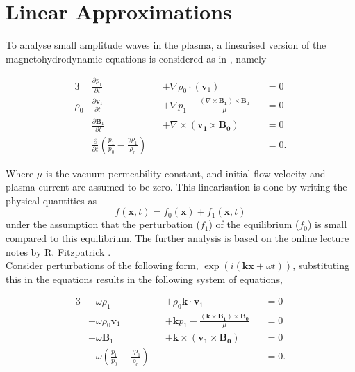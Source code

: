 \documentclass{article}
\begin{document}
\section{Linear Approximations} \label{sec:linear_approximations}

To analyse small amplitude waves in the plasma, a linearised version of the magnetohydrodynamic equations is considered as in \cite{Fitzpatricknotes}, namely

\begin{alignat}{3}
    &\frac{\partial \rho_1}{\partial t} &&+ \nabla \rho_0 \cdot (\mathbf v_1) &&= 0 \tag{mass}\label{eq:masslin}\\
    \rho_0&\frac{\partial \mathbf v_1}{\partial t} &&+  \nabla p_1 - \frac{(\nabla \times \mathbf{B_1}) \times \mathbf{B_0}}{\mu} &&= 0 \tag{moment}\label{eq:cauchymomentlin}\\
    &\frac{\partial \mathbf B_1}{\partial t} &&+ \nabla \times (\mathbf{v_1} \times \mathbf{B_0}) &&= 0 \tag{charge}\label{eq:faradaylin}\\
    &\frac{\partial}{\partial t}(\frac{p_1}{p_0} - \frac{\gamma\rho_1}{\rho_0}) && &&= 0 \tag{energy}\label{eq:energylin}.
\end{alignat}

Where $\mu$ is the vacuum permeability constant, and initial flow velocity and plasma current are assumed to be zero. This linearisation is done by writing the physical quantities as
\begin{equation*}
    f(\mathbf{x},t) = f_0(\mathbf{x}) + f_1(\mathbf{x},t)
\end{equation*}
under the assumption that the perturbation ($f_1$) of the equilibrium ($f_0$) is small compared to this equilibrium.
The further analysis is based on the online lecture notes by R. Fitzpatrick \cite{Fitzpatricknotes}.\\

Consider perturbations of the following form, $\exp(i(\mathbf{kx} + \omega t))$, substituting this in the equations results in the following system of equations,

\begin{alignat}{3}
    &-\omega\rho_1 &&+  \rho_0 \mathbf{k}\cdot\mathbf v_1 &&= 0 \label{eq:MHD_linear_wave_mass}\\
    &-\omega\rho_0\mathbf v_1 &&+  \mathbf{k} p_1 - \frac{(\mathbf{k} \times \mathbf{B_1}) \times \mathbf{B_0}}{\mu} &&= 0 \label{eq:MHD_linear_wave_moment}\\
    &-\omega\mathbf B_1&&+ \mathbf{k} \times (\mathbf{v_1} \times \mathbf{B_0}) &&= 0 \label{eq:MHD_linear_wave_charge}\\
    &-\omega(\frac{p_1}{p_0} - \frac{\gamma\rho_1}{\rho_0}) && &&= 0  \label{eq:MHD_linear_wave_enery}.
\end{alignat}
\end{document}
